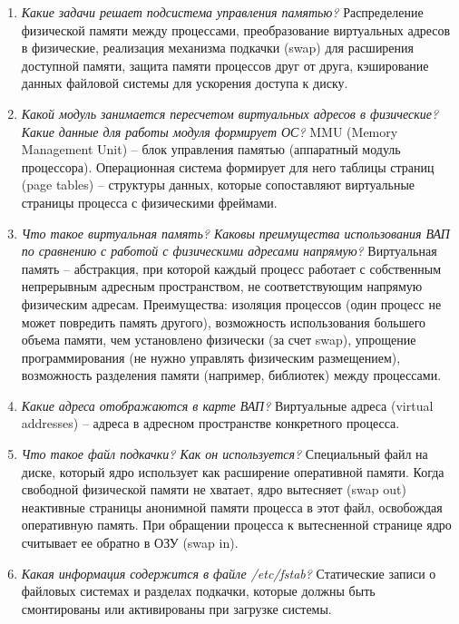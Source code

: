 \begin{enumerate}
	\item \textit{Какие задачи решает подсистема управления памятью?}\newline 
	Распределение физической памяти между процессами, преобразование виртуальных адресов в физические, реализация механизма подкачки (swap) для расширения доступной памяти, защита памяти процессов друг от друга, кэширование данных файловой системы для ускорения доступа к диску.
	\item \textit{Какой модуль занимается пересчетом виртуальных адресов в физические? Какие данные для работы модуля формирует ОС?}\newline 
	MMU (Memory Management Unit) -- блок управления памятью (аппаратный модуль процессора).
	Операционная система формирует для него таблицы страниц (page tables) -- структуры данных, которые сопоставляют виртуальные страницы процесса с физическими фреймами. 
	\item \textit{Что такое виртуальная память? Каковы преимущества использования ВАП по сравнению с работой с физическими адресами напрямую?}\newline 
	Виртуальная память -- абстракция, при которой каждый процесс работает с собственным непрерывным адресным пространством, не соответствующим напрямую физическим адресам. 
	Преимущества:
	изоляция процессов (один процесс не может повредить память другого),
	возможность использования большего объема памяти, чем установлено физически (за счет swap),
	упрощение программирования (не нужно управлять физическим размещением),
	возможность разделения памяти (например, библиотек) между процессами.
	\item \textit{Какие адреса отображаются в карте ВАП?}\newline 
	Виртуальные адреса (virtual addresses) -- адреса в адресном пространстве конкретного процесса. 
	\item \textit{Что такое файл подкачки? Как он используется?}\newline 
	Специальный файл на диске, который ядро использует как расширение оперативной памяти. 
	Когда свободной физической памяти не хватает, ядро вытесняет (swap out) неактивные страницы анонимной памяти процесса в этот файл, освобождая оперативную память. При обращении процесса к вытесненной странице ядро считывает ее обратно в ОЗУ (swap in).
	\item \textit{Какая информация содержится в файле /etc/fstab?}\newline 
	Статические записи о файловых системах и разделах подкачки, которые должны быть смонтированы или активированы при загрузке системы.

\end{enumerate}
